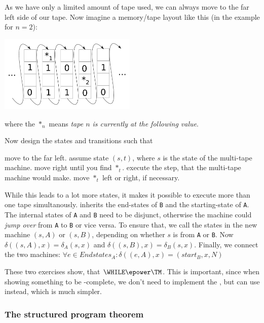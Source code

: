 \begin{Answer}
	\Question As we have only a limited amount of tape used, we can always move 
		to the far left side of our tape. Now imagine a memory/tape layout like 
		this (in the example for $n=2$):
		\begin{center}
			\includegraphics[width=0.49\textwidth]{computability/completeness/pictures/multitape}
		\end{center}
		where the $*_n$ means {\em tape $n$ is currently at the following value}. 
		
		Now design the states and transitions such that
		\begin{algorithmic}[1]
				\State move to the far left.
				\State assume state $(s, t)$, where $s$ is the state of the multi-tape machine.
				\State move right until you find $*_t$.
				\State execute the step, that the multi-tape machine would make.
				\State move $*_t$ left or right, if necessary.
			\EndFor
		\end{algorithmic}
		While this leads to a lot more states, it makes it possible to execute 
		more than one tape simultanously.
	 inherits the end-states of {\tt B} and the 
		starting-state of {\tt A}. The internal states of {\tt A} and {\tt B} 
		need to be disjunct, otherwise the machine could {\em jump over} from 
		{\tt A} to {\tt B} or vice versa. To ensure that, we call the states in 
		the new machine $(s, A)$ or $(s, B)$, depending on whether $s$ is from 
		{\tt A} or {\tt B}. Now $\delta((s,A), x) = \delta_A(s,x)$ and
		$\delta((s,B), x) = \delta_B(s,x)$. Finally, we connect the two machines:
		$\forall e\in Endstates_A: \delta((e, A), x) = (start_B, x, N)$
\end{Answer}

These two exercises show, that $\WHILE\epower\TM$. This is important, since 
when showing something to be \WHILE-complete, we don't need to implement the 
\WHILE, but can use \TM instead, which is much simpler.

\subsubsection{The structured program theorem}

